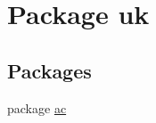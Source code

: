 \hypertarget{namespaceuk}{\section{Package uk}
\label{namespaceuk}
}
\subsection*{Packages}
\begin{DoxyCompactItemize}
\item 
package \hyperlink{namespaceuk_1_1ac}{ac}
\end{DoxyCompactItemize}
